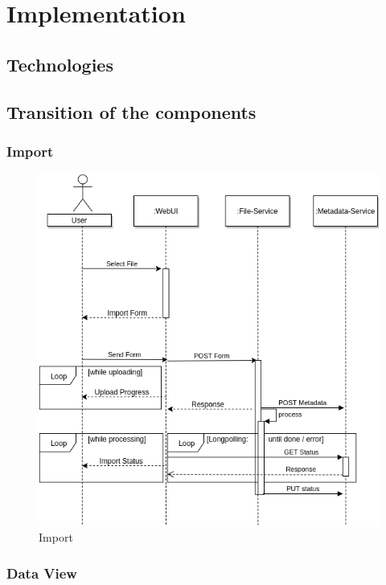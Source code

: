 \chapter{Implementation}
\section{Technologies}
\section{Transition of the components}
\subsection{Import}
\begin{figure}[H]
	\centering\includegraphics[width=.75\textwidth]{res/Import}
	\caption{Import}
	\label{fig:import}
\end{figure}
\subsection{Data View}
